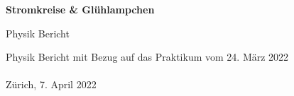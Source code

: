 \begin{titlepage}

    \begin{center}
        \vspace*{8cm}
        \Huge
        \textbf{Stromkreise \& Glühlampchen}
 
        \vspace{0.5cm}
        \LARGE
        Physik Bericht  
    \end{center}
    \vspace*{8cm}
    \normalsize
    \hspace*{2cm}Physik Bericht mit Bezug auf das Praktikum vom 24. März 2022\\\\
    \hspace*{2cm}Zürich, 7. April 2022
    
             
 \end{titlepage}